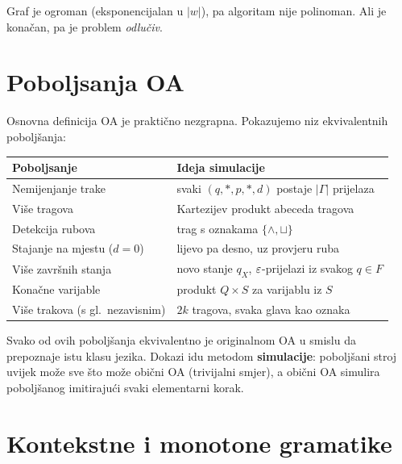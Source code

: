 \begin{napomena}
Graf je ogroman (eksponencijalan u $|w|$), pa algoritam nije
polinoman. Ali je konačan, pa je problem \emph{odlučiv}.
\end{napomena}

\section{Poboljsanja OA}

Osnovna definicija OA je praktično nezgrapna. Pokazujemo niz
ekvivalentnih poboljšanja:

\begin{center}
\renewcommand{\arraystretch}{1.5}
\begin{tabular}{ll}
\hline
\textbf{Poboljsanje} & \textbf{Ideja simulacije} \\
\hline
Nemijenjanje trake & svaki $(q, *, p, *, d)$ postaje $|\Gamma|$ prijelaza \\
Više tragova & Kartezijev produkt abeceda tragova \\
Detekcija rubova & trag s oznakama $\{\wedge, \sqcup\}$ \\
Stajanje na mjestu ($d = 0$) & lijevo pa desno, uz provjeru ruba \\
Više završnih stanja & novo stanje $q_X$, $\varepsilon$-prijelazi iz svakog $q \in F$ \\
Konačne varijable & produkt $Q \times S$ za varijablu iz $S$ \\
Više trakova (s gl.\ nezavisnim) & $2k$ tragova, svaka glava kao oznaka \\
\hline
\end{tabular}
\end{center}

Svako od ovih poboljšanja ekvivalentno je originalnom OA u smislu
da prepoznaje istu klasu jezika. Dokazi idu metodom \textbf{simulacije}:
poboljšani stroj uvijek može sve što može obični OA (trivijalni smjer),
a obični OA simulira poboljšanog imitirajući svaki elementarni korak.

\section{Kontekstne i monotone gramatike}

